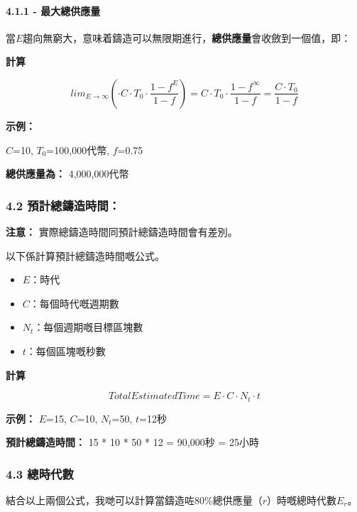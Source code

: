 \documentclass[
]{article}
\providecommand{\tightlist}{%
  \setlength{\itemsep}{0pt}\setlength{\parskip}{0pt}}
\begin{document}
\paragraph{4.1.1 -
最大總供應量}\label{ux6700ux5927ux7e3dux4f9bux61c9ux91cf}

當\(E\)趨向無窮大，意味着鑄造可以無限期進行，\textbf{總供應量}會收斂到一個值，即：

\textbf{計算}

\begin{equation}
lim_{E→\infty}(\cdot C \cdot T_0\cdot\frac{1-f^E}{1-f})=C \cdot T_0\cdot \frac{1-f^{\infty}}{1-f}=\frac{C\cdot T_0}{1-f}
\end{equation}

\textbf{示例：}

\(C\)=10, \(T_0\)=100,000代幣, \(f\)=0.75

\textbf{總供應量為：} 4,000,000代幣

\subsubsection{4.2
預計總鑄造時間：}\label{ux9810ux8a08ux7e3dux9444ux9020ux6642ux9593}

\textbf{注意：} 實際總鑄造時間同預計總鑄造時間會有差別。

以下係計算預計總鑄造時間嘅公式。

\begin{itemize}
\tightlist
\item
  \(E\)：時代
\item
  \(C\)：每個時代嘅週期數
\item
  \(N_t\)：每個週期嘅目標區塊數
\item
  \(t\)：每個區塊嘅秒數
\end{itemize}

\textbf{計算}

\begin{equation}
TotalEstimatedTime = E \cdot C \cdot N_t \cdot t
\end{equation}

\textbf{示例：} \(E\)=15, \(C\)=10, \(N_t\)=50, \(t\)=12秒

\textbf{預計總鑄造時間：} 15 * 10 * 50 * 12 = 90,000秒 = 25小時

\subsubsection{4.3 總時代數}\label{ux7e3dux6642ux4ee3ux6578}

結合以上兩個公式，我哋可以計算當鑄造咗80\%總供應量（\(r\)）時嘅總時代數\(E_r\)。
\end{document}
